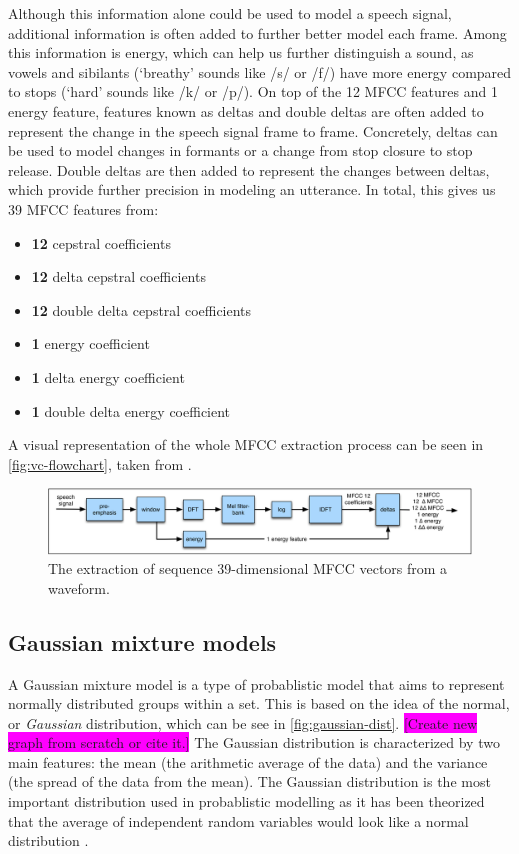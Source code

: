 \documentclass
[
    a4paper,
    twoside,
    12pt,
]
{report}
\begin{document}
Although this information alone could be used to model a speech signal,
additional information is often added to further better model each
frame. Among this information is energy, which can help us further
distinguish a sound, as vowels and sibilants (`breathy' sounds like /s/
or /f/) have more energy compared to stops (`hard' sounds like /k/ or
/p/). On top of the 12 MFCC features and 1 energy feature, features
known as deltas and double deltas are often added to represent the
change in the speech signal frame to frame. Concretely, deltas can be
used to model changes in formants or a change from stop closure to stop
release. Double deltas are then added to represent the changes between
deltas, which provide further precision in modeling an utterance. In
total, this gives us 39 MFCC features from:

\begin{itemize}
   \setlength\itemsep{-1em}
   \item{\textbf{12} cepstral coefficients}
   \item{\textbf{12} delta cepstral coefficients}
   \item{\textbf{12} double delta cepstral coefficients}
   \item{\textbf{1} energy coefficient}
   \item{\textbf{1} delta energy coefficient}
   \item{\textbf{1} double delta energy coefficient}
\end{itemize}

A visual representation of the whole MFCC extraction process can be seen
in \autoref{fig:vc-flowchart}, taken from \textcite{jurafsky2009}.

\begin{figure}[H]
\centering
\includegraphics[scale=0.22]{img/mfcc-extraction.png}
\caption{The extraction of sequence 39-dimensional MFCC vectors from a waveform.}
\label{fig:vc-flowchart}
\end{figure}

\subsection{Gaussian mixture models}

A Gaussian mixture model is a type of probablistic model that aims to
represent normally distributed groups within a set. This is based on the
idea of the normal, or \emph{Gaussian} distribution, which can be see in
\autoref{fig:gaussian-dist}.
\colorbox{magenta}{[Create new graph from scratch or cite it.]} The
Gaussian distribution is characterized by two main features: the mean
(the arithmetic average of the data) and the variance (the spread of the
data from the mean). The Gaussian distribution is the most important
distribution used in probablistic modelling as it has been theorized
that the average of independent random variables would look like a
normal distribution \parencite{mcgonagle2016}.
\end{document}
